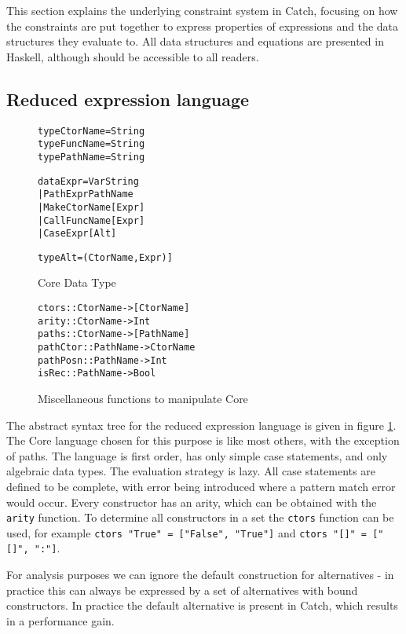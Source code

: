 \documentclass[preprint]{sigplanconf}
\newcommand{\T}[1]{\texttt{#1}}
\newenvironment{code}{\begin{alltt}\small}{\end{alltt}}
\begin{document}
This section explains the underlying constraint system in Catch, focusing on how the constraints are put together to express properties of expressions and the data structures they evaluate to. All data structures and equations are presented in Haskell, although should be accessible to all readers.

\subsection{Reduced expression language}

\begin{figure}
\begin{code}
type CtorName = String
type FuncName = String
type PathName = String

data Expr = Var String
          | Path Expr PathName
          | Make CtorName [Expr]
          | Call FuncName [Expr]
          | Case Expr [Alt]

type Alt = (CtorName, Expr)]
\end{code}
\caption{Core Data Type}
\label{fig:core}
\end{figure}

\begin{figure}
\begin{code}
ctors :: CtorName -> [CtorName]
arity :: CtorName -> Int
paths :: CtorName -> [PathName]
pathCtor :: PathName -> CtorName
pathPosn :: PathName -> Int
isRec :: PathName -> Bool
\end{code}
\caption{Miscellaneous functions to manipulate Core}
\end{figure}

The abstract syntax tree for the reduced expression language is given in figure \ref{fig:core}. The Core language chosen for this purpose is like most others, with the exception of paths. The language is first order, has only simple case statements, and only algebraic data types. The evaluation strategy is lazy. All case statements are defined to be complete, with error being introduced where a pattern match error would occur. Every constructor has an arity, which can be obtained with the \T{arity} function. To determine all constructors in a set the \T{ctors} function can be used, for example \T{ctors "True" = ["False", "True"]} and \T{ctors "[]" = ["[]", ":"]}.

For analysis purposes we can ignore the default construction for alternatives - in practice this can always be expressed by a set of alternatives with bound constructors. In practice the default alternative is present in Catch, which results in a performance gain.
\end{document}
